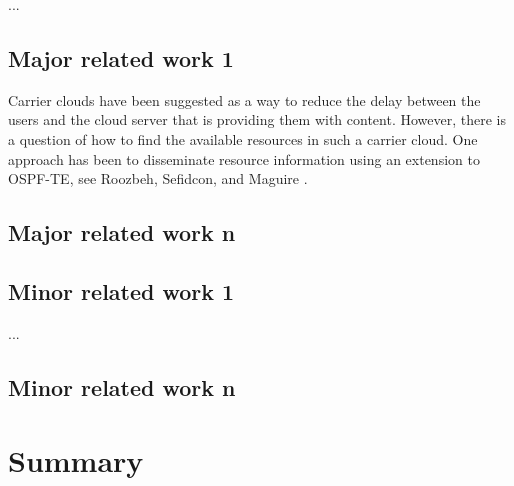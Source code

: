 
...


\subsection{Major related work 1}

Carrier clouds have been suggested as a way to reduce the delay between the users and the cloud server that is providing them with content. However, there is a question of how to find the available resources in such a carrier cloud. One approach has been to disseminate resource information using an extension to OSPF-TE, see Roozbeh, Sefidcon, and Maguire \cite{roozbeh_resource_2013}.

\subsection{Major related work n}

\subsection{Minor related work 1}

...

\subsection{Minor related work n}

\section{Summary}



\cleardoublepage



